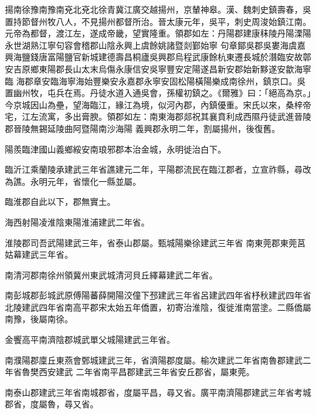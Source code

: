 
\begin{pinyinscope}

 揚南徐豫南豫南兗北兗北徐青冀江廣交越揚州，京輦神皋。漢、魏刺史鎮壽春，吳置持節督州牧八人，不見揚州都督所治。晉太康元年，吳平，刺史周浚始鎮江南。元帝為都督，渡江左，遂成帝畿，望實隆重。領郡如左：丹陽郡建康秣陵丹陽溧陽永世湖熟江寧句容會稽郡山陰永興上虞餘姚諸暨剡鄞始寧
 句章鄮吳郡吳婁海虞嘉興海鹽錢唐富陽鹽官新城建德壽昌桐廬吳興郡烏程武康餘杭東遷長城於潛臨安故鄣安吉原鄉東陽郡長山太末烏傷永康信安吳寧豐安定陽遂昌新安郡始新黟遂安歙海寧臨
 海郡章安臨海寧海始豐樂安永嘉郡永寧安固松陽橫陽樂成南徐州，鎮京口。吳置幽州牧，屯兵在焉。丹徒水道入通吳會，孫權初鎮之。《爾雅》曰：「絕高為京。」今京城因山為壘，望海臨江，緣江為境，似河內郡，內鎮優重。宋氏以來，桑梓帝宅，江左流寓，多出膏腴。領郡如左：南東海郡郯祝其襄賁利成西隰丹徒武進晉陵郡晉陵無錫延陵曲阿暨陽南沙海陽
 義興郡永明二年，割屬揚州，後復舊。



 陽羨臨津國山義鄉綏安南琅邪郡本治金城，永明徙治白下。



 臨沂江乘蘭陵承建武三年省譙建元二年，平陽郡流民在臨江郡者，立宣祚縣，尋改為譙。永明元年，省懷化一縣並屬。



 臨淮郡自此以下，郡無實土。



 海西射陽凌淮陰東陽淮浦建武二年省。



 淮陵郡司吾武陽建武三年，省泰山郡屬。甄城陽樂徐建武三年省
 南東莞郡東莞莒姑幕建武三年省。



 南清河郡南徐州領冀州東武城清河貝丘繹幕建武二年省。



 南彭城郡彭城武原傅陽蕃薛開陽洨僮下邳建武三年省呂建武四年省杼秋建武四年省北陵建武四年省南高平郡宋太始五年僑置，初寄治淮陰，復徙淮南當塗。二縣僑屬南豫，後屬南徐。



 金饗高平南濟陰郡城武單父城陽建武三年省。



 南濮陽郡廩丘東燕會鄄城建武三年，省濟陽郡度屬。榆次建武二年省南魯郡建武二年省魯樊西安建武
 二年省南平昌郡建武三年省安丘郡省，屬東莞。



 南泰山郡建武三年省南城郡省，度屬平昌，尋又省。廣平南濟陽郡建武三年省考城郡省，度屬魯，尋又省。




\end{pinyinscope}
